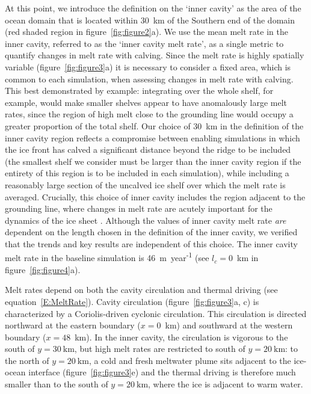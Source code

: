 \documentclass[draft]{agujournal2019}
\begin{document}
At this point, we introduce the definition on the `inner cavity' as the area of the ocean domain that is located within 30~km of the Southern end of the domain (red shaded region in figure~\ref{fig:figure2}a). We use the mean melt rate in the inner cavity, referred to as the `inner cavity melt rate', as a single metric to quantify changes in melt rate with calving. Since the melt rate is highly spatially variable (figure~\ref{fig:figure3}a) it is necessary to consider a fixed area, which is common to each simulation, when assessing changes in melt rate with calving. This best demonstrated by example: integrating over the whole shelf, for example, would make smaller shelves appear to have anomalously large melt rates, since the region of high melt close to the grounding line would occupy a greater proportion of the total shelf. %
Our choice of 30~km in the definition of the inner cavity region reflects a compromise between enabling simulations in which the ice front has calved a significant distance beyond the ridge to be included (the smallest shelf we consider must be larger than the inner cavity region if the entirety of this region is to be included in each simulation), while including a reasonably large section of the uncalved ice shelf over which the melt rate is averaged. Crucially, this choice of inner cavity includes the region adjacent to the grounding line, where changes in melt rate are acutely important for the dynamics of the ice sheet \cite{Seroussi2014Cryo, Athern2017GRL}. Although the values of inner cavity melt rate \textit{are} dependent on the length chosen in the definition of the inner cavity, we verified that the trends and key results are independent of this choice. The inner cavity melt rate in the baseline simulation is 46~m~year\textsuperscript{-1} (see $l_c = 0$~km in figure~\ref{fig:figure4}a).

Melt rates depend on both the cavity circulation and thermal driving (see equation~\eqref{E:MeltRate}). Cavity circulation (figure~\ref{fig:figure3}a, c) is characterized by a Coriolis-driven cyclonic circulation. This circulation is directed northward at the eastern boundary ($x=0$~km) and southward at the western boundary ($x=48$~km). In the inner cavity, the circulation is vigorous to the south of $y=30~\text{km}$, but high melt rates are restricted to south of $y=20~\text{km}$: to the north of $y=20~\text{km}$, a cold and fresh meltwater plume sits adjacent to the ice-ocean interface (figure~\ref{fig:figure3}e) and the thermal driving is therefore much smaller than to the south of $y=20~\text{km}$, where the ice is adjacent to warm water.
\end{document}
